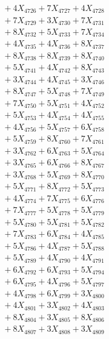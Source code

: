 \documentclass[a4paper,10pt]{article}
\begin{document}
{\begin{align}
&\;  + 4 X_{4726} + 7 X_{4727} + 4 X_{4728} \\[0.3ex]
&\;  + 7 X_{4729} + 3 X_{4730} + 7 X_{4731} \\[0.3ex]
&\;  + 8 X_{4732} + 5 X_{4733} + 7 X_{4734} \\[0.3ex]
&\;  + 4 X_{4735} + 4 X_{4736} + 8 X_{4737} \\[0.3ex]
&\;  + 8 X_{4738} + 8 X_{4739} + 8 X_{4740} \\[0.3ex]
&\;  + 5 X_{4741} + 4 X_{4742} + 8 X_{4743} \\[0.3ex]
&\;  + 3 X_{4744} + 4 X_{4745} + 3 X_{4746} \\[0.3ex]
&\;  + 8 X_{4747} + 5 X_{4748} + 7 X_{4749} \\[0.5ex]\allowbreak
&\;  + 7 X_{4750} + 5 X_{4751} + 4 X_{4752} \\[0.3ex]
&\;  + 5 X_{4753} + 4 X_{4754} + 4 X_{4755} \\[0.3ex]
&\;  + 4 X_{4756} + 5 X_{4757} + 6 X_{4758} \\[0.3ex]
&\;  + 5 X_{4759} + 8 X_{4760} + 7 X_{4761} \\[0.3ex]
&\;  + 3 X_{4762} + 6 X_{4763} + 5 X_{4764} \\[0.3ex]
&\;  + 3 X_{4765} + 6 X_{4766} + 8 X_{4767} \\[0.3ex]
&\;  + 3 X_{4768} + 5 X_{4769} + 8 X_{4770} \\[0.3ex]
&\;  + 5 X_{4771} + 8 X_{4772} + 5 X_{4773} \\[0.3ex]
&\;  + 4 X_{4774} + 7 X_{4775} + 6 X_{4776} \\[0.3ex]
&\;  + 7 X_{4777} + 5 X_{4778} + 5 X_{4779} \\[0.5ex]\allowbreak
&\;  + 5 X_{4780} + 5 X_{4781} + 5 X_{4782} \\[0.3ex]
&\;  + 7 X_{4783} + 6 X_{4784} + 4 X_{4785} \\[0.3ex]
&\;  + 5 X_{4786} + 4 X_{4787} + 5 X_{4788} \\[0.3ex]
&\;  + 5 X_{4789} + 4 X_{4790} + 4 X_{4791} \\[0.3ex]
&\;  + 6 X_{4792} + 6 X_{4793} + 5 X_{4794} \\[0.3ex]
&\;  + 6 X_{4795} + 4 X_{4796} + 5 X_{4797} \\[0.3ex]
&\;  + 4 X_{4798} + 6 X_{4799} + 3 X_{4800} \\[0.3ex]
&\;  + 4 X_{4801} + 3 X_{4802} + 4 X_{4803} \\[0.3ex]
&\;  + 8 X_{4804} + 3 X_{4805} + 8 X_{4806} \\[0.3ex]
&\;  + 8 X_{4807} + 3 X_{4808} + 3 X_{4809} \\[0.5ex]\allowbreak

\end{align}}
\end{document}
